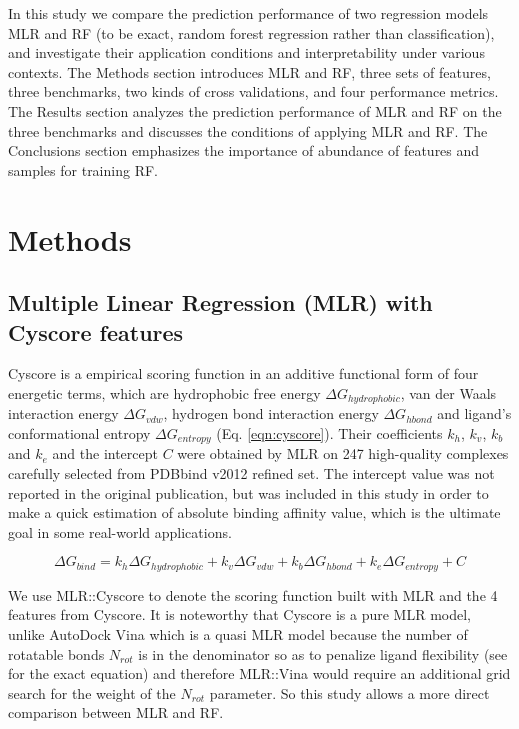 \documentclass[linenumbers]{bmcart}
\begin{document}
In this study we compare the prediction performance of two regression models MLR and RF (to be exact, random forest regression rather than classification), and investigate their application conditions and interpretability under various contexts. The Methods section introduces MLR and RF, three sets of features, three benchmarks, two kinds of cross validations, and four performance metrics. The Results section analyzes the prediction performance of MLR and RF on the three benchmarks and discusses the conditions of applying MLR and RF. The Conclusions section emphasizes the importance of abundance of features and samples for training RF.

\section*{Methods}

\subsection*{Multiple Linear Regression (MLR) with Cyscore features}

Cyscore is a empirical scoring function in an additive functional form of four energetic terms, which are hydrophobic free energy $\Delta G_{hydrophobic}$, van der Waals interaction energy $\Delta G_{vdw}$, hydrogen bond interaction energy $\Delta G_{hbond}$ and ligand's conformational entropy $\Delta G_{entropy}$ (Eq. \ref{eqn:cyscore}). Their coefficients $k_h$, $k_v$, $k_b$ and $k_e$ and the intercept $C$ were obtained by MLR on 247 high-quality complexes carefully selected from PDBbind v2012 refined set. The intercept value was not reported in the original publication, but was included in this study in order to make a quick estimation of absolute binding affinity value, which is the ultimate goal in some real-world applications.

\begin{equation}
\Delta G_{bind} = k_h\Delta G_{hydrophobic} + k_v\Delta G_{vdw} + k_b\Delta G_{hbond} + k_e\Delta G_{entropy} + C
\label{eqn:cyscore}
\end{equation}

We use MLR::Cyscore to denote the scoring function built with MLR and the 4 features from Cyscore. It is noteworthy that Cyscore is a pure MLR model, unlike AutoDock Vina \cite{595} which is a quasi MLR model because the number of rotatable bonds $N_{rot}$ is in the denominator so as to penalize ligand flexibility (see \cite{1362} for the exact equation) and therefore MLR::Vina would require an additional grid search for the weight of the $N_{rot}$ parameter. So this study allows a more direct comparison between MLR and RF.
\end{document}
